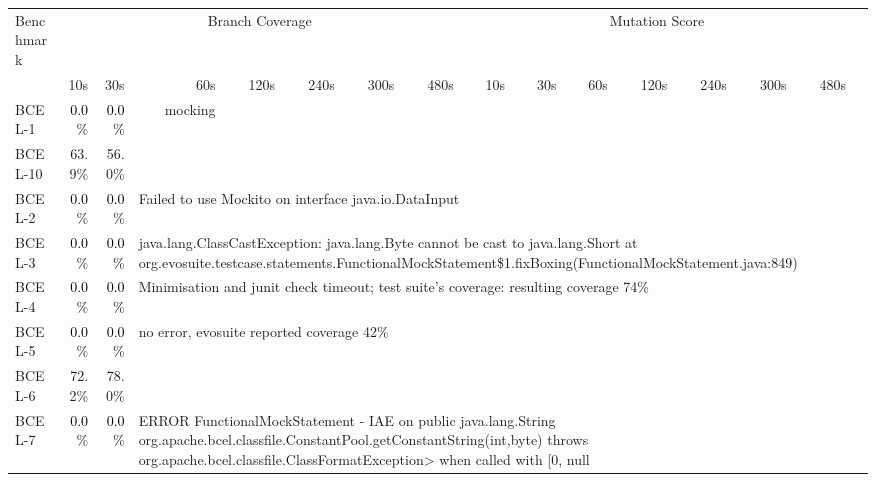 \begin{tabular}{ l rrrrrrr rrrrrrrr}\toprule 
 Benchmark &  \multicolumn{7}{c}{Branch Coverage} &  \multicolumn{7}{c}{Mutation Score}\\ 
 & 10s & 30s & 60s & 120s & 240s & 300s & 480s & 10s & 30s & 60s & 120s & 240s & 300s & 480s \\ 
\midrule 
BCEL-1 & \cellcolor{light-gray} \textcolor{black}{0.0}\% &
                                                           \cellcolor{light-gray}
                                                           \textcolor{black}{0.0}\%
 & mocking\\ 
BCEL-10 & 63.9\% & 56.0\%\\ 
BCEL-2 & \cellcolor{light-gray} \textcolor{black}{0.0}\% &
                                                           \cellcolor{light-gray}
                                                           \textcolor{black}{0.0}\%
 & \multicolumn{12}{l}{Failed to use Mockito on interface java.io.DataInput}\\ 
BCEL-3 & \cellcolor{light-gray} \textcolor{black}{0.0}\% &
                                                           \cellcolor{light-gray}
                                                           \textcolor{black}{0.0}\%
 & \multicolumn{12}{l}{java.lang.ClassCastException: java.lang.Byte
   cannot be cast to java.lang.Short at org.evosuite.testcase.statements.FunctionalMockStatement\$1.fixBoxing(FunctionalMockStatement.java:849)}\\ 
BCEL-4 & \cellcolor{light-gray} \textcolor{black}{0.0}\% &
                                                           \cellcolor{light-gray}
                                                           \textcolor{black}{0.0}\%
 & \multicolumn{13}{l}{Minimisation and junit check timeout; test
   suite's coverage: resulting coverage 74\% } \\ 
BCEL-5 & \cellcolor{light-gray} \textcolor{black}{0.0}\% &
                                                           \cellcolor{light-gray}
                                                           \textcolor{black}{0.0}\%
 & \multicolumn{13}{l}{no error, evosuite reported coverage 42\%}\\ 
BCEL-6 & 72.2\% & 78.0\%\\ 
BCEL-7 & \cellcolor{light-gray} \textcolor{black}{0.0}\% &
                                                           \cellcolor{light-gray} \textcolor{black}{0.0}\%& \multicolumn{13}{l}{ERROR FunctionalMockStatement - IAE on public java.lang.String org.apache.bcel.classfile.ConstantPool.getConstantString(int,byte) throws org.apache.bcel.classfile.ClassFormatException> when called with [0, null}\\ 

\end{tabular}
